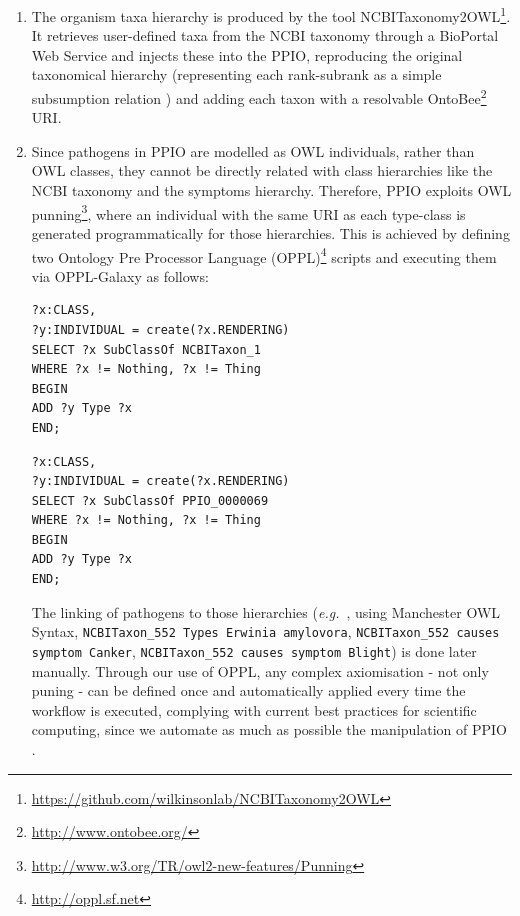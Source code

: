 \documentclass[sw]{iosart2c}
\newcommand{\myurl}[1]{\footnote{\url{#1}}}
\newcommand{\eg}{\emph{e.g.}\xspace}
\newcommand{\con}[1]{\texttt{#1}\xspace}
\begin{document}
\begin{enumerate}

\item The organism taxa hierarchy is produced by the tool NCBITaxonomy2OWL\myurl{https://github.com/wilkinsonlab/NCBITaxonomy2OWL}. It retrieves user-defined taxa from the NCBI taxonomy through a BioPortal Web Service \cite{bioportal} and injects these into the PPIO, reproducing the original taxonomical hierarchy (representing each rank-subrank as a simple subsumption relation \cite{taxa_ismb_2008}) and adding each taxon with a resolvable OntoBee\myurl{http://www.ontobee.org/} URI.

\item Since pathogens in PPIO are modelled as OWL individuals, rather than OWL classes, they cannot be directly related with class hierarchies like the NCBI taxonomy and the symptoms hierarchy. Therefore, PPIO exploits OWL punning\myurl{http://www.w3.org/TR/owl2-new-features/Punning}, where an individual with the same URI as each type-class is generated programmatically for those hierarchies. This is achieved by defining two Ontology Pre Processor Language (OPPL)\myurl{http://oppl.sf.net} scripts and executing them via OPPL-Galaxy \cite{OPPL-Galaxy-JBMS} as follows:

{\small 
\begin{verbatim}
?x:CLASS,
?y:INDIVIDUAL = create(?x.RENDERING)
SELECT ?x SubClassOf NCBITaxon_1
WHERE ?x != Nothing, ?x != Thing
BEGIN
ADD ?y Type ?x
END;
\end{verbatim}
}

{\small 
\begin{verbatim}
?x:CLASS,
?y:INDIVIDUAL = create(?x.RENDERING)
SELECT ?x SubClassOf PPIO_0000069
WHERE ?x != Nothing, ?x != Thing
BEGIN
ADD ?y Type ?x
END;
\end{verbatim}
}

The linking of pathogens to those hierarchies (\eg~, using Manchester OWL Syntax, \con{NCBITaxon\_552 Types Erwinia amylovora}, \con{NCBITaxon\_552 causes symptom Canker}, \con{NCBITaxon\_552 causes symptom Blight}) is done later manually. Through our use of OPPL, any complex axiomisation - not only puning - can be defined once and automatically applied every time the workflow is executed, complying with current best practices for scientific computing, since we automate as much as possible the manipulation of PPIO \cite{bp_computing}.

\end{enumerate}
\end{document}
